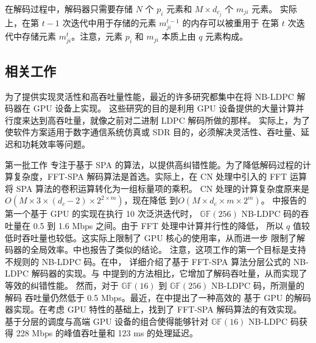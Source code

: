\documentclass{cjc}
\begin{document}
  在解码过程中，解码器只需要存储 $N$ 个 $p_i$ 元素和 $M\times{d_{c_j}}$ 个 $m_{ji}$ 元素。
  实际上，在第 $t−1$ 次迭代中用于存储的元素 $m^{t-1}_{ji}$ 的内存可以被重用于
  在第 $t$ 次迭代中存储元素 $m^t_{ji}$。注意，元素 $p_i$ 和 $m_{ji}$ 本质上由 $q$ 元素构成。

\subsection{相关工作}
  
  为了提供实现灵活性和高吞吐量性能，最近的许多研究都集中在将 NB-LDPC 解码器在 GPU 设备上实现\cite{noauthor_wang_nodate,noauthor_andrade_nodate,noauthor_beermann_nodate,andrade_optimized_2014,noauthor_thi_nodate,beermann_gpu_2015,noauthor_pham_nodate,liu_high-throughput_2018}。
  这些研究的目的是利用 GPU 设备提供的大量计算并行度来达到高吞吐量，就像之前对二进制
  LDPC 解码所做的那样\cite{li_efficient_2013,lin_high_2014,gal_high-throughput_2016}。
  实际上，为了使软件方案适用于数字通信系统仿真或 SDR 目的，必须解决灵活性、吞吐量、延迟和功耗效率等问题。

  第一批工作\cite{noauthor_andrade_nodate,noauthor_beermann_nodate,andrade_optimized_2014,beermann_gpu_2015,liu_high-throughput_2018}
  专注于基于 SPA 的算法，以提供高纠错性能。为了降低解码过程的计算复杂度，FFT-SPA \cite{noauthor_andrade_nodate}
  解码算法是首选。实际上，在 CN 处理中引入的 FFT 运算将 SPA 算法的卷积运算转化为一组标量项的乘积。
  CN 处理的计算复杂度原来是$O(M\times3\times(d_c−2)\times2^{2{\times}m})$，现在降低
  到$O(M\times{d_c}\times{m}\times2^{m})$\cite{declercq_decoding_2007}。
  \cite{noauthor_andrade_nodate}中报告的第一个基于 GPU 的实现在执行 10 次泛洪迭代时，
  $\mathbb{GF}(256)$ NB-LDPC 码的吞吐量在 0.5 到 1.6 Mbps 之间。由于 FFT 处理中计算并行性的降低，
  所以 $q$ 值较低时吞吐量也较低。这实际上限制了 GPU 核心的使用率，从而进一步
  限制了解码器的全局效率。\cite{noauthor_beermann_nodate}中也报告了类似的结论。
  注意，这项工作的第一个目标是支持不规则的 NB-LDPC 码。在\cite{beermann_gpu_2015}中，
  详细介绍了基于 FFT-SPA 算法分层公式的 NB-LDPC 解码器的实现。与\cite{noauthor_beermann_nodate}
  中提到的方法相比，它增加了解码吞吐量，从而实现了等效的纠错性能。
  然而，对于 $\mathbb{GF}(16)$ 到 $\mathbb{GF}(256)$ NB-LDPC 码，所测量的解码
  吞吐量仍然低于 0.5 Mbps。最近，在\cite{liu_high-throughput_2018}中提出了一种高效的
  基于 GPU 的解码器实现。在考虑 GPU 特性的基础上，找到了 FFT-SPA 解码算法的有效实现。
  基于分层的调度与高端 GPU 设备的组合使得能够针对 $\mathbb{GF}(16)$ NB-LDPC 码获得
  228 Mbps 的峰值吞吐量和 123 ms 的处理延迟。
\end{document}

